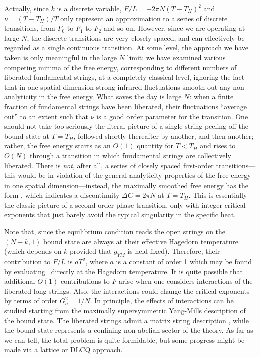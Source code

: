  Actually, since $k$ is a discrete variable, $F/L = -2\pi N (T-T_H)^2$
and $\nu = (T-T_H)/T$ only represent an approximation to a series of discrete
transitions, from $F_0$ to $F_1$ to $F_2$ and so on.  However, since we
are operating at large $N$, the discrete transitions are very closely
spaced, and can effectively be regarded as a single continuous
transition.
At some level, the approach we have taken is
only meaningful in the large $N$ limit: we have examined
various competing minima of the free energy, corresponding to
different numbers of liberated fundamental strings, at a completely
classical level, ignoring the fact that in one spatial dimension
strong infrared fluctuations smooth out any non-analyticity in the
free energy.  What saves the day is large $N$: when a finite fraction
of fundamental strings have been liberated, their fluctuations
``average out'' to an extent such that $\nu$ is a good order parameter
for the transition.  One should not take too seriously the literal
picture of a single string peeling off the bound state at $T=T_H$,
followed shortly thereafter by another, and then another; rather, the
free energy starts as an $O(1)$ quantity for $T<T_H$ and rises to
$O(N)$ through a transition in which fundamental strings are
collectively liberated.  There is {\it not}, after all, a series of
closely spaced first-order transitions---this would be in violation of
the general analyticity properties of the free energy in one spatial
dimension---instead, the maximally smoothed free energy has the form
\TotalF, which indicates a discontinuity $\Delta C = 2\pi N$ at
$T=T_H$.  This is essentially the classic picture of a second order phase
transition, only with integer critical exponents that just barely
avoid the typical singularity in the specific heat.  

Note that, since the equilibrium condition reads
the open strings on the $(N-k,1)$ bound state are always at their
effective Hagedorn temperature (which depends on $k$ provided that
$g_{YM}$ is held fixed). Therefore, their contribution to $F/L$
is $a T^2$, where $a$ is a constant of order 1 which may be found by
evaluating \zncos\ directly at the Hagedorn temperature.
It is quite possible
that additional $O(1)$ contributions to $F$ arise when one considers
interactions of the liberated long strings.
Also, the interactions
could change the critical exponents by terms of order
$G_o^2=1/N$.  In principle, the
effects of interactions can be studied starting from the maximally
supersymmetric Yang-Mills description of the bound state.  The
liberated strings admit a matrix string description 
\cite{Motl,Banks,DVV}, while
the bound state represents a confining non-abelian sector of the
theory.  As far as we can tell, the total problem is quite formidable,
but some progress might be made via a lattice or DLCQ approach.

